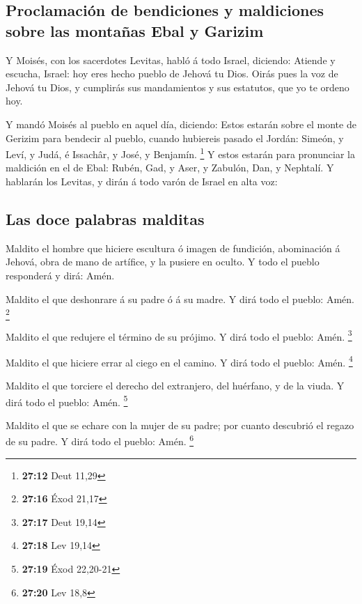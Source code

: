 \hypertarget{proclamaciuxf3n-de-bendiciones-y-maldiciones-sobre-las-montauxf1as-ebal-y-garizim}{%
\subsection{Proclamación de bendiciones y maldiciones sobre las montañas
Ebal y
Garizim}\label{proclamaciuxf3n-de-bendiciones-y-maldiciones-sobre-las-montauxf1as-ebal-y-garizim}}

 Y Moisés, con los sacerdotes Levitas, habló á todo Israel,
diciendo: Atiende y escucha, Israel: hoy eres hecho pueblo de Jehová tu
Dios.  Oirás pues la voz de Jehová tu Dios, y cumplirás sus
mandamientos y sus estatutos, que yo te ordeno hoy.

 Y mandó Moisés al pueblo en aquel día, diciendo:
 Estos estarán sobre el monte de Gerizim para bendecir al
pueblo, cuando hubiereis pasado el Jordán: Simeón, y Leví, y Judá, é
Issachâr, y José, y Benjamín. \footnote{\textbf{27:12} Deut 11,29}
 Y estos estarán para pronunciar la maldición en el de
Ebal: Rubén, Gad, y Aser, y Zabulón, Dan, y Nephtalí.  Y
hablarán los Levitas, y dirán á todo varón de Israel en alta voz:

\hypertarget{las-doce-palabras-malditas}{%
\subsection{Las doce palabras
malditas}\label{las-doce-palabras-malditas}}

 Maldito el hombre que hiciere escultura ó imagen de
fundición, abominación á Jehová, obra de mano de artífice, y la pusiere
en oculto. Y todo el pueblo responderá y dirá: Amén.

 Maldito el que deshonrare á su padre ó á su madre. Y dirá
todo el pueblo: Amén. \footnote{\textbf{27:16} Éxod 21,17}

 Maldito el que redujere el término de su prójimo. Y dirá
todo el pueblo: Amén. \footnote{\textbf{27:17} Deut 19,14}

 Maldito el que hiciere errar al ciego en el camino. Y dirá
todo el pueblo: Amén. \footnote{\textbf{27:18} Lev 19,14}

 Maldito el que torciere el derecho del extranjero, del
huérfano, y de la viuda. Y dirá todo el pueblo: Amén. \footnote{\textbf{27:19}
  Éxod 22,20-21}

 Maldito el que se echare con la mujer de su padre; por
cuanto descubrió el regazo de su padre. Y dirá todo el pueblo: Amén.
\footnote{\textbf{27:20} Lev 18,8}

